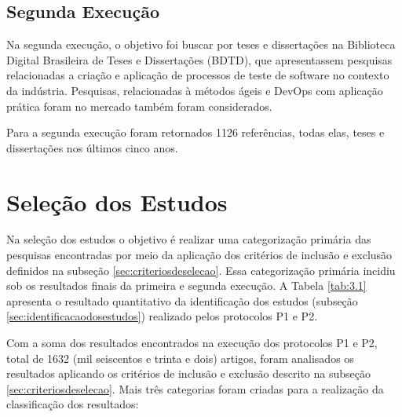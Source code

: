 \subsection{Segunda Execução}

Na segunda execução, o objetivo foi buscar por teses e dissertações na Biblioteca Digital Brasileira de Teses e Dissertações (BDTD), que apresentassem pesquisas relacionadas a criação e aplicação  de processos de teste de software no contexto da indústria. Pesquisas, relacionadas à métodos ágeis e DevOps com aplicação prática foram no mercado também foram considerados.

Para a segunda execução foram retornados 1126 referências, todas elas, teses e dissertações nos últimos cinco anos. 

\section{Seleção dos Estudos}
\label{sec:selecaodosestudos}

Na seleção dos estudos o objetivo é realizar uma categorização primária das pesquisas encontradas por meio da aplicação dos critérios de inclusão e exclusão definidos na subseção \ref{sec:criteriosdeselecao}. Essa categorização primária incidiu sob os resultados finais da primeira e segunda execução. A Tabela \ref{tab:3.1} apresenta o resultado quantitativo da identificação dos estudos (subseção \ref{sec:identificacaodosestudos}) realizado pelos protocolos P1 e P2.

\begin{table}[H]
\centering
\caption{Total de artigos identificados na pesquisa.}
\label{tab:3.1}
\end{table}

Com a soma dos resultados encontrados na execução dos protocolos P1 e P2, total de 1632 (mil seiscentos e trinta e dois) artigos, foram analisados os resultados aplicando os critérios de inclusão e exclusão descrito na subseção \ref{sec:criteriosdeselecao}. Mais três categorias foram criadas para a realização da classificação dos resultados:

